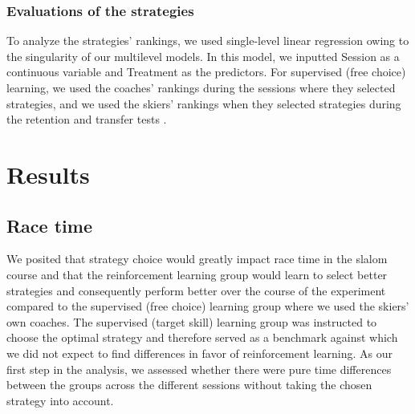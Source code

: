 \documentclass[pdflatex,sn-mathphys-num]{sn-jnl}%
\theoremstyle{thmstyleone}%
\theoremstyle{thmstyletwo}%
\theoremstyle{thmstylethree}%
\begin{document}
\subsubsection{Evaluations of the strategies}
To analyze the strategies' rankings, we used single-level linear regression owing to the singularity of our multilevel models. In this model, we inputted Session as a continuous variable and Treatment as the predictors. For supervised (free choice) learning, we used the coaches' rankings during the sessions where they selected strategies, and we used the skiers' rankings when they selected strategies during the retention and transfer tests .



\section{Results}


\subsection{Race time}\label{result_racetime}
We posited that strategy choice would greatly impact race time in the slalom course and that the reinforcement learning group would learn to select better strategies and consequently perform better over the course of the experiment compared to the supervised (free choice) learning group where we used the skiers' own coaches. The supervised (target skill) learning group was instructed to choose the optimal strategy and therefore served as a benchmark against which we did not expect to find differences in favor of reinforcement learning. As our first step in the analysis, we assessed whether there were pure time differences between the groups across the different sessions without taking the chosen strategy into account. 
\end{document}
